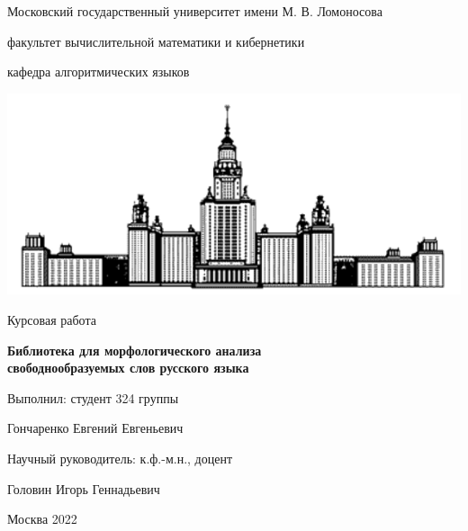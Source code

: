 \thispagestyle{empty}
\begin{center}
{
    \large
    Московский государственный университет имени М. В. Ломоносова\par
    факультет вычислительной математики и кибернетики\par
    кафедра алгоритмических языков\par
}
\par
\end{center}

\vspace{10mm}
\begin{flushright}

{\sl}%
\end{flushright}

\begin{center}
%

\includegraphics[width=\linewidth]{images/logo}

\vspace{25mm}
Курсовая работа

\vspace{5mm}
{
    \bf \large
    Библиотека для морфологического анализа \\ свободнообразуемых слов русского языка
    \par
}

\end{center}

\vspace{10mm}
\begin{flushright}
Выполнил: студент 324 группы

Гончаренко Евгений Евгеньевич

\vspace{10mm}
Научный руководитель: к.ф.-м.н., доцент

Головин Игорь Геннадьевич
\end{flushright}

\vspace{5mm}
\begin{center}
{Москва 2022}
\end{center}

\newpage
